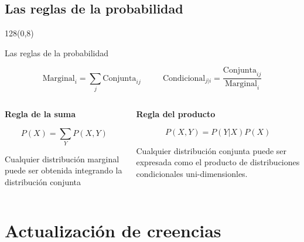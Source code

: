 \documentclass[shownotes]{beamer}
\begin{document}
\subsection{Las reglas de la probabilidad}

\begin{frame}
\begin{textblock}{128}(0,8)
\begin{center}
 \large Las reglas de la probabilidad
\end{center}
\end{textblock}


\vspace{0.75cm}



\begin{equation*}
  \text{Marginal}_{i} = \sum_j \text{Conjunta}_{ij}  \ \ \ \ \ \ \ \ \ \ \ \  \text{Condicional}_{j|i} = \frac{\text{Conjunta}_{ij}}{\text{Marginal}_{i}}
\end{equation*}

\pause
\vspace{0.75cm}


\begin{columns}[t]
\begin{column}{0.5\textwidth}
 \centering \textbf{Regla de la suma}
 
 
\begin{equation*}
 P(X) = \sum_Y P(X,Y)
\end{equation*}
 
 \justifying \footnotesize
  Cualquier distribución marginal puede ser obtenida integrando la distribución conjunta

 \end{column}
 \begin{column}{0.5\textwidth}
\centering  \textbf{Regla del producto}

\begin{equation*}
 P(X,Y) = P(Y|X) P(X)
\end{equation*}

 \justifying \footnotesize
Cualquier distribución conjunta puede ser expresada como el producto de distribuciones condicionales uni-dimensionles.

\end{column}
\end{columns}

\end{frame}

 \section{Actualizaci\'on de creencias}
 
\end{document}
